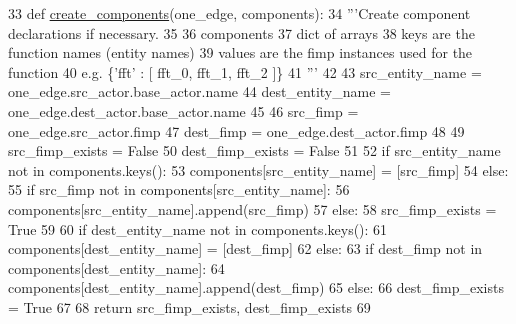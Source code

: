 \begin{DoxyCode}
33 \textcolor{keyword}{def }\hyperlink{namespacesylva_1_1code__generation_1_1hsdf__to__vhdl_a3672bd3c4fb6d5c86df2d4cd1f64e875}{create\_components}(one\_edge, components):
34     \textcolor{stringliteral}{'''Create component declarations if necessary.}
35 \textcolor{stringliteral}{}
36 \textcolor{stringliteral}{      components}
37 \textcolor{stringliteral}{        dict of arrays}
38 \textcolor{stringliteral}{        keys are the function names (entity names)}
39 \textcolor{stringliteral}{        values are the fimp instances used for the function}
40 \textcolor{stringliteral}{        e.g. \{'fft' : [ fft\_0, fft\_1, fft\_2 ]\}}
41 \textcolor{stringliteral}{    '''}
42 
43     src\_entity\_name = one\_edge.src\_actor.base\_actor.name
44     dest\_entity\_name = one\_edge.dest\_actor.base\_actor.name
45 
46     src\_fimp = one\_edge.src\_actor.fimp
47     dest\_fimp = one\_edge.dest\_actor.fimp
48 
49     src\_fimp\_exists = \textcolor{keyword}{False}
50     dest\_fimp\_exists = \textcolor{keyword}{False}
51 
52     \textcolor{keywordflow}{if} src\_entity\_name \textcolor{keywordflow}{not} \textcolor{keywordflow}{in} components.keys():
53         components[src\_entity\_name] = [src\_fimp]
54     \textcolor{keywordflow}{else}:
55         \textcolor{keywordflow}{if} src\_fimp \textcolor{keywordflow}{not} \textcolor{keywordflow}{in} components[src\_entity\_name]:
56             components[src\_entity\_name].append(src\_fimp)
57         \textcolor{keywordflow}{else}:
58             src\_fimp\_exists = \textcolor{keyword}{True}
59 
60     \textcolor{keywordflow}{if} dest\_entity\_name \textcolor{keywordflow}{not} \textcolor{keywordflow}{in} components.keys():
61         components[dest\_entity\_name] = [dest\_fimp]
62     \textcolor{keywordflow}{else}:
63         \textcolor{keywordflow}{if} dest\_fimp \textcolor{keywordflow}{not} \textcolor{keywordflow}{in} components[dest\_entity\_name]:
64             components[dest\_entity\_name].append(dest\_fimp)
65         \textcolor{keywordflow}{else}:
66             dest\_fimp\_exists = \textcolor{keyword}{True}
67 
68     \textcolor{keywordflow}{return} src\_fimp\_exists, dest\_fimp\_exists
69 
\end{DoxyCode}
\mbox{\label{namespacesylva_1_1code__generation_1_1hsdf__to__vhdl_a5381a4c2d460f5f0490d0361e37917e9}} 
